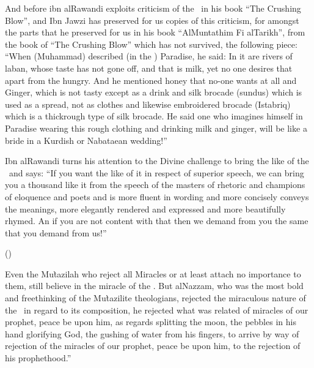 \documentclass[12pt]{memoir}
\begin{document}

And before ibn al\–Rawandi exploits criticism of the \Quran\ in his book “The
Crushing Blow”, and Ibn Jawzi has preserved for us copies of this criticism,
for amongst the parts that he preserved for us in his book “Al\–Muntathim Fi
al\–Tarikh”, from the book of “The Crushing Blow” which has not survived, the
following piece: “When (Muhammad) described (in the \Quran) Paradise, he said:
In it are rivers of laban, whose taste has not gone off, and that is milk, yet
no one desires that apart from the hungry. And he mentioned honey that no-one
wants at all and Ginger, which is not tasty except as a drink and silk brocade
(sundus) which is used as a spread, not as clothes and likewise embroidered
brocade (Istabriq) which is a thick\/rough type of silk brocade.
He said one who
imagines himself in Paradise wearing this rough clothing and drinking milk and
ginger, will be like a bride in a Kurdish or Nabataean wedding!”\fnmark


Ibn al\–Rawandi turns his attention to the Divine challenge to bring the like of
the \Quran\ and says: “If you want the like of it in respect of superior speech,
we can bring you a thousand like it from the speech of the masters of rhetoric
and champions of eloquence and poets and is more fluent in wording and more
concisely conveys the meanings, more elegantly rendered and expressed and more
beautifully rhymed. An if you are not content with that then we demand from you
the same that you demand from us!”\fnmark


()

Even the Mu\`tazilah who reject all Miracles or at least attach no importance to
them, still believe in the miracle of the \Quran.\fnmark\@
{}
But al\–Nazzam, who was the most bold and freethinking of the Mu\`tazilite
theologians, rejected the miraculous nature of the \Quran\ in regard to its
composition, he rejected what was related of miracles of our prophet, peace be
upon him, as regards splitting the moon, the pebbles in his hand glorifying
God, the gushing of water from his fingers, to arrive by way of rejection of
the miracles of our prophet, peace be upon him, to the rejection of his
prophethood.”\fnmark
\end{document}
